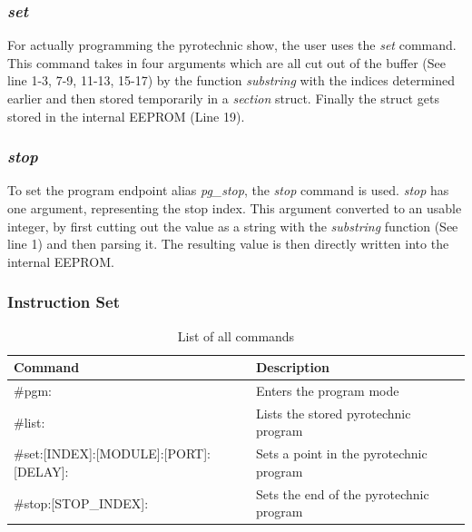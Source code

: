 \subsubsection{\textit{set}}
For actually programming the pyrotechnic show, the user uses the \textit{set} command. This command takes in four arguments which are all cut out of the buffer (See  line 1-3, 7-9, 11-13, 15-17) by the function \textit{substring} with the indices determined earlier and then stored temporarily in a \textit{section} struct. Finally the struct gets stored in the internal EEPROM (Line 19).\\



\pagebreak

\subsubsection{\textit{stop}}
To set the program endpoint alias \textit{pg\_stop}, the \textit{stop} command is used. \textit{stop} has one argument, representing the stop index. This argument converted to an usable integer, by first cutting out the value as a string with the \textit{substring} function (See  line 1) and then parsing it. The resulting value is then directly written into the internal EEPROM.\\




\subsubsection{Instruction Set}
\label{Instruction Set}

\begin{table}[ht!]
\centering
\begin{tabular}{|l|l|} 
\hline
Command                                & Description                                              \\ 
\hline \hline
\#pgm:                                 & Enters the program mode \\ 
\hline
\#list:                                & Lists the stored pyrotechnic program\\ 
\hline
\#set:[INDEX]:[MODULE]:[PORT]:[DELAY]: & Sets a point in the pyrotechnic program\\ 
\hline
\#stop:[STOP\_INDEX]:                  & Sets the end of the pyrotechnic program\\
\hline
\end{tabular}
\caption{List of all commands}
\label{tab:instruction_set}
\end{table}

\pagebreak